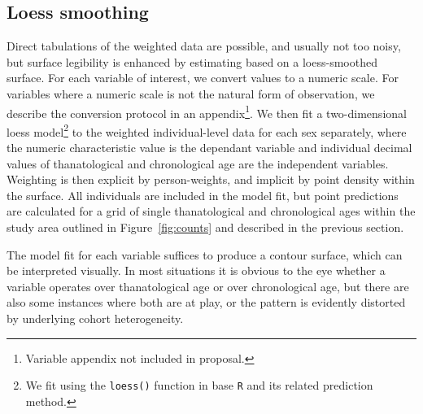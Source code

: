 \documentclass{article}
\begin{document}
\subsection{Loess smoothing}
Direct tabulations of the weighted data are possible, and usually not too noisy,
but surface legibility is enhanced by estimating based on a loess-smoothed
surface. For each variable of interest, we convert values to a numeric scale.
For variables where a numeric scale is not the natural form of observation, we
describe the conversion protocol in an appendix\footnote{Variable appendix not
included in proposal.}. We then fit a two-dimensional loess model\footnote{We
fit using the \texttt{loess()} function in base \texttt{R}
\citep{cleveland1992local,Rcore2013} and its related prediction method.} to the
weighted individual-level data for each sex separately, where the numeric characteristic value is the dependant variable and individual decimal values of thanatological and chronological age are the independent variables.
Weighting is then explicit by person-weights, and implicit by point density
within the surface. All individuals are included in the model fit, but point
predictions are calculated for a grid of single thanatological and chronological
ages within the study area outlined in Figure~\ref{fig:counts} and described in
the previous section. 

The model fit for each variable suffices to produce a contour surface, which can
be interpreted visually. In most situations it is obvious to the eye whether a
variable operates over thanatological age or over chronological age, but there
are also some instances where both are at play, or the pattern is evidently
distorted by underlying cohort heterogeneity.

\FloatBarrier


   
  
\end{document}
